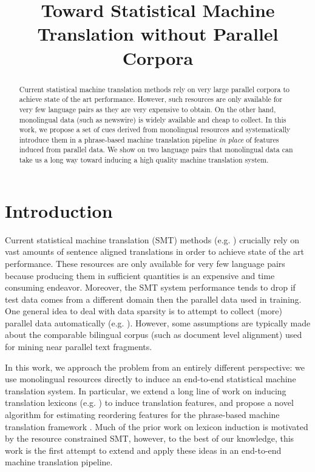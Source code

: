 \documentclass[11pt]{article}
\title{Toward Statistical Machine Translation without Parallel Corpora}
\author{}
\date{}
\newcommand{\mnote}[1]{\marginpar{%
  \vskip-\baselineskip
  \raggedright\footnotesize
  \itshape\hrule\smallskip\tiny{#1}\par\smallskip\hrule}}
\newcommand{\mtodo}[1]{\mnote{\textcolor{red}{#1}}}
\begin{document}
\maketitle
\begin{abstract}
Current statistical machine translation methods rely on very large parallel corpora to achieve state of the art performance.  However, such resources are only available for very few language pairs as they are very expensive to obtain.  On the other hand, monolingual data (such as newswire) is widely available and cheap to collect.  In this work, we propose a set of cues derived from monolingual resources and systematically introduce them in a phrase-based machine translation pipeline \emph{in place} of features induced from parallel data.  We show on two language pairs that monolingual data can take us a long way toward  inducing a high quality machine translation system.\mtodo{Need a more concrete statement.}
\end{abstract}


\section{Introduction} \label{sect:intro}
Current statistical machine translation (SMT) methods (e.g. \cite{Koehn:2003,Chiang:2005}) crucially rely on vast amounts of sentence aligned translations in order to achieve state of the art performance.  These resources are only available for very few language pairs because producing them in sufficient quantities is an expensive and time consuming endeavor.  Moreover, the SMT system performance tends to drop if test data comes from a different domain then the parallel data used in training\mtodo{Need a good MT adaptation reference}.  One general idea to deal with data sparsity is to attempt to collect (more) parallel data automatically (e.g. \cite{Munteanu:2006,Smith:2010,Uszkoreit:2010}).\mtodo{Need a better "however" sentence.}  However, some assumptions are typically made about the comparable bilingual corpus (such as document level alignment) used for mining near parallel text fragments.

In this work, we approach the problem from an entirely different perspective: we use monolingual resources directly to induce an end-to-end statistical machine translation system.  In particular, we extend a long line of work on inducing translation lexicons (e.g. \cite{Rapp:1995,Fung:1998,Koehn:2000,Klementiev:2006b,Haghighi:2008,Mimno:2009}) to induce translation features, and propose a novel algorithm for estimating reordering features for the phrase-based machine translation framework \cite{Koehn:2003}.  Much of the prior work on lexicon induction is motivated by the resource constrained SMT, however, to the best of our knowledge, this work is the first attempt to extend and apply these ideas in an end-to-end machine translation pipeline.
\end{document}
